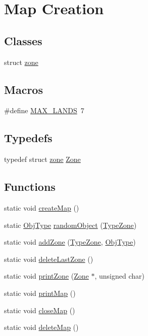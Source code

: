 \hypertarget{group__map}{}\section{Map Creation}
\label{group__map}
\subsection*{Classes}
\begin{DoxyCompactItemize}
\item 
struct \hyperlink{structzone}{zone}
\end{DoxyCompactItemize}
\subsection*{Macros}
\begin{DoxyCompactItemize}
\item 
\#define \hyperlink{group__map_ga9c08b7bd8c03fd9c8a06b299e08629d7}{M\+A\+X\+\_\+\+L\+A\+N\+DS}~7
\end{DoxyCompactItemize}
\subsection*{Typedefs}
\begin{DoxyCompactItemize}
\item 
typedef struct \hyperlink{structzone}{zone} \hyperlink{group__map_ga25bd5049e352284b30a6a239fa772249}{Zone}
\end{DoxyCompactItemize}
\subsection*{Functions}
\begin{DoxyCompactItemize}
\item 
static void \hyperlink{group__map_gafdfcddc56725f04f4bfab96b3342f5ad}{create\+Map} ()
\item 
static \hyperlink{gamelib_8h_a21ada50c882656c2a4723dde25f56d4a}{Obj\+Type} \hyperlink{group__map_ga14c46e63cc9c0b8cbc9b48efcde61609}{random\+Object} (\hyperlink{gamelib_8h_a8bc11a12fbea40ab4ffab0cfcfa9b5af}{Type\+Zone})
\item 
static void \hyperlink{group__map_ga62518152079402c1d5dd4d7cb135ebb6}{add\+Zone} (\hyperlink{gamelib_8h_a8bc11a12fbea40ab4ffab0cfcfa9b5af}{Type\+Zone}, \hyperlink{gamelib_8h_a21ada50c882656c2a4723dde25f56d4a}{Obj\+Type})
\item 
static void \hyperlink{group__map_ga9200eca02abbb391411ab23fb57cf2c1}{delete\+Last\+Zone} ()
\item 
static void \hyperlink{group__map_ga821f387806e6d9f8581df4d9823bb3e3}{print\+Zone} (\hyperlink{group__map_ga25bd5049e352284b30a6a239fa772249}{Zone} $\ast$, unsigned char)
\item 
static void \hyperlink{group__map_ga2057afa3403f93d17b2de845f095ac4f}{print\+Map} ()
\item 
static void \hyperlink{group__map_ga9c640fbe71cfc185d2031bfd50c3c697}{close\+Map} ()
\item 
static void \hyperlink{group__map_gad2a3b491f7cad674d88b575680059ad5}{delete\+Map} ()
\end{DoxyCompactItemize}
